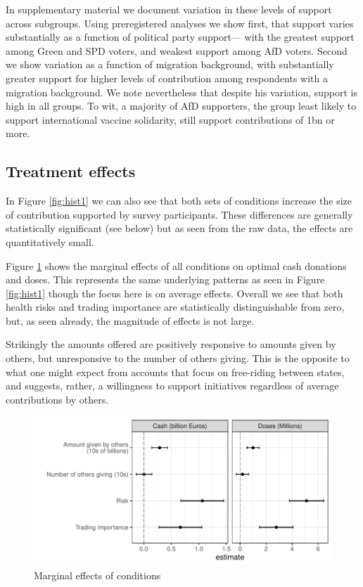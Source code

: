 \documentclass[]{article}
\begin{document}
In supplementary material we document variation in these levels of support across subgroups. Using preregistered analyses we show first, that support varies substantially as a function of political party support--- with the greatest support among Green and SPD voters, and weakest support among AfD voters. Second we show variation as a  function of migration background, with substantially greater support for higher levels of contribution among respondents with a migration background. We note nevertheless that despite his variation, support is high in all groups. To wit, a majority of AfD supporters, the group least likely to support international vaccine solidarity, still support contributions of \texteuro 1bn  or more.  

\subsection{Treatment effects}

In Figure \ref{fig:hist1}  we can also see that both sets of conditions increase the size of contribution supported by survey participants. These differences are generally statistically significant (see below) but as seen from the raw data, the effects are quantitatively small. 


Figure \ref{fig:main1} shows the marginal effects of all conditions on optimal cash donations and doses. This represents the same underlying patterns as seen in Figure \ref{fig:hist1} though the focus here is on average effects. Overall we see that both health risks and trading importance are statistically distinguishable from zero, but, as seen already, the magnitude of effects is not large. 

Strikingly the amounts offered are positively responsive to amounts given by others, but unresponsive to the number of others giving. This is the opposite to what one might expect from accounts that focus on free-riding between states, and suggests, rather, a willingness to support initiatives regardless of average contributions by others. 

\begin{figure}[hbt!]
	\includegraphics[width=\linewidth]{"../2_output/E1_main.pdf"}
	\caption{Marginal effects of conditions}
	\label{fig:main1}
\end{figure}
\end{document}
